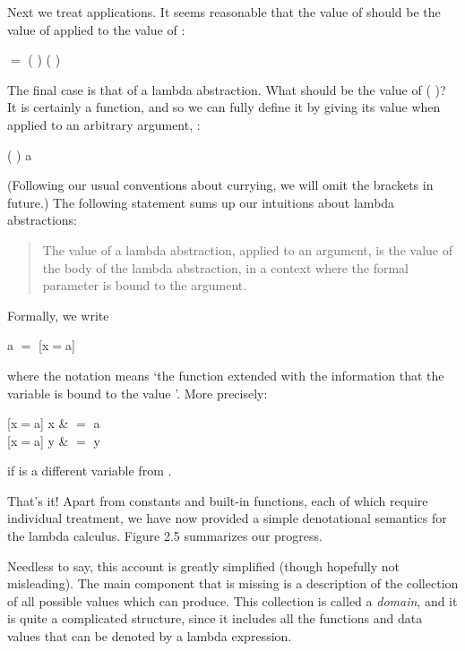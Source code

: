 Next we treat applications. It seems reasonable that the value of 
should be the value of  applied to the value of :
\begin{mlcoded}
     \tr{} $=$ ( \tr{}) ( \tr{})
\end{mlcoded}
The final case is that of a lambda abstraction. What should be the value of
( \tr{})? It is certainly a function, and so we can fully define it by
giving its value when applied to an arbitrary argument, :
\begin{mlcoded}
    ( \tr{}) a
\end{mlcoded}
(Following our usual conventions about currying, we will omit the brackets in
future.) The following statement sums up our intuitions about lambda
abstractions:
\begin{quote}
The value of a lambda abstraction, applied to an argument, is the value of
the body of the lambda abstraction, in a context where the formal
parameter is bound to the argument.
\end{quote}
Formally, we write
\begin{mlcoded}
     \tr{} a $=$  \tr{}[x$=$a]
\end{mlcoded}
where the notation \ml{(\tr{}[x=a])} means `the function \ml{(\tr{})} extended with the
information that the variable  is bound to the value '. More precisely:
\begin{mlalign}
    \tr{}[x$=$a] x & $=$ a \\
    \tr{}[x$=$a] y & $=$ \tr{} y
\end{mlalign}
if  is a different variable from .

That's it! Apart from constants and built-in functions, each of which require
individual treatment, we have now provided a simple denotational semantics
for the lambda calculus. Figure 2.5 summarizes our progress.

Needless to say, this account is greatly simplified (though hopefully not
misleading). The main component that is missing is a description of the
collection of all possible values which  can produce. This collection is
called a \textit{domain}, and it is quite a complicated structure, since it includes all the functions and data values that can be denoted by a lambda expression.

